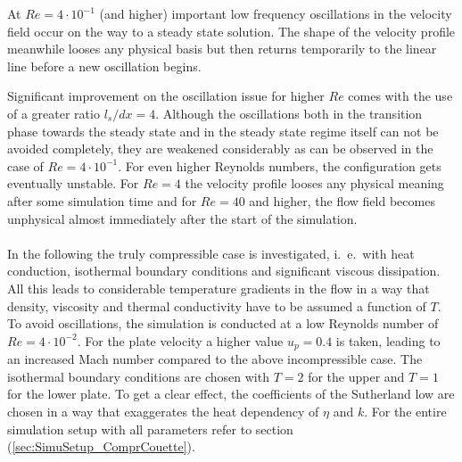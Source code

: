 \documentclass[11pt,a4paper,twoside]{report}
\begin{document}
At $Re=4\cdot10^{-1}$ (and higher) important low frequency oscillations in the velocity field occur on the way to a steady state solution. The shape of the velocity profile meanwhile looses any physical basis but then returns temporarily to the linear line before a new oscillation begins.

Significant improvement on the oscillation issue for higher $Re$ comes with the use of a greater ratio $l_s/dx=4$. Although the oscillations both in the transition phase towards the steady state and in the steady state regime itself can not be avoided completely, they are weakened considerably as can be observed in the case of $Re=4\cdot10^{-1}$. 
For even higher Reynolds numbers, the configuration gets eventually unstable. For $Re=4$ the velocity profile looses any physical meaning after some simulation time and for $Re=40$ and higher, the flow field becomes unphysical almost immediately after the start of the simulation.\\
\\
\indent
In the following the truly compressible case is investigated, i.\ e.\ with heat conduction, isothermal boundary conditions and significant viscous dissipation. All this leads to considerable temperature gradients in the flow in a way that density, viscosity and thermal conductivity have to be assumed a function of $T$. To avoid oscillations, the simulation is conducted at a low Reynolds number of $Re=4\cdot10^{-2}$. For the plate velocity a higher value $u_p=0.4$ is taken, leading to an increased Mach number compared to the above incompressible case. The isothermal boundary conditions are chosen with $T=2$ for the upper and $T=1$ for the lower plate. To get a clear effect, the coefficients of the Sutherland low are chosen in a way that exaggerates the heat dependency of $\eta$ and $k$. For the entire simulation setup with all parameters refer to section (\ref{sec:SimuSetup_ComprCouette}). %
\end{document}
